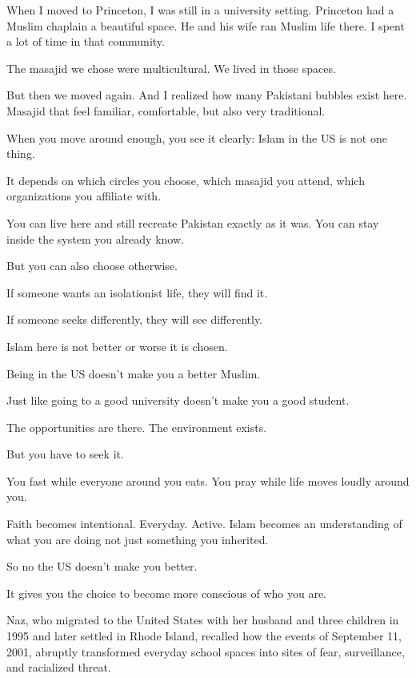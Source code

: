 \begin{FoundPoem}
    When I moved to Princeton,
    I was still in a university setting.
    Princeton had a Muslim chaplain
    a beautiful space.
    He and his wife ran Muslim life there.
    I spent a lot of time in that community.
    
    The masajid we chose were multicultural.
    We lived in those spaces.
    
    But then we moved again.
    And I realized
    how many Pakistani bubbles exist here.
    Masajid that feel familiar,
    comfortable,
    but also very traditional.
    
    When you move around enough,
    you see it clearly:
    Islam in the US is not one thing.
    
    It depends on
    which circles you choose,
    which masajid you attend,
    which organizations you affiliate with.
    
    You can live here
    and still recreate Pakistan exactly as it was.
    You can stay inside the system
    you already know.
    
    But you can also choose otherwise.
    
    If someone wants an isolationist life,
    they will find it.
    
    If someone seeks differently,
    they will see differently.
    
    Islam here is not better or worse
    it is chosen.
    
    Being in the US doesn’t make you
    a better Muslim.
    
    Just like going to a good university
    doesn’t make you a good student.
    
    The opportunities are there.
    The environment exists.
    
    But you have to seek it.
    
    You fast
    while everyone around you eats.
    You pray
    while life moves loudly around you.
    
    Faith becomes intentional.
    Everyday.
    Active.
    Islam becomes
    an understanding of what you are doing
    not just something you inherited.
    
    So no
    the US doesn’t make you better.
    
    It gives you the choice
    to become more conscious
    of who you are.
\end{FoundPoem}

Naz, who migrated to the United States with her husband and three children in 1995 and later settled in Rhode Island, recalled how the events of September 11, 2001, abruptly transformed everyday school spaces into sites of fear, surveillance, and racialized threat.

